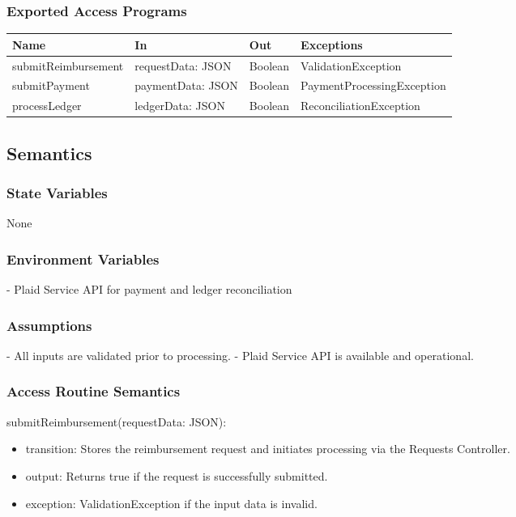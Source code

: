 \documentclass[12pt, titlepage]{article}
\begin{document}
\subsubsection{Exported Access Programs}
\begin{center}
\begin{tabular}{p{2cm} p{4cm} p{4cm} p{2cm}}
\hline
\textbf{Name} & \textbf{In} & \textbf{Out} & \textbf{Exceptions} \\
\hline
submitReimbursement & requestData: JSON & Boolean & ValidationException \\
submitPayment & paymentData: JSON & Boolean & PaymentProcessingException \\
processLedger & ledgerData: JSON & Boolean & ReconciliationException \\
\hline
\end{tabular}
\end{center}

\subsection{Semantics}

\subsubsection{State Variables}
None

\subsubsection{Environment Variables}
- Plaid Service API for payment and ledger reconciliation

\subsubsection{Assumptions}
- All inputs are validated prior to processing.
- Plaid Service API is available and operational.

\subsubsection{Access Routine Semantics}
\noindent submitReimbursement(requestData: JSON):
\begin{itemize}
\item transition: Stores the reimbursement request and initiates processing via the Requests Controller.
\item output: Returns true if the request is successfully submitted.
\item exception: ValidationException if the input data is invalid.
\end{itemize}
\end{document}
